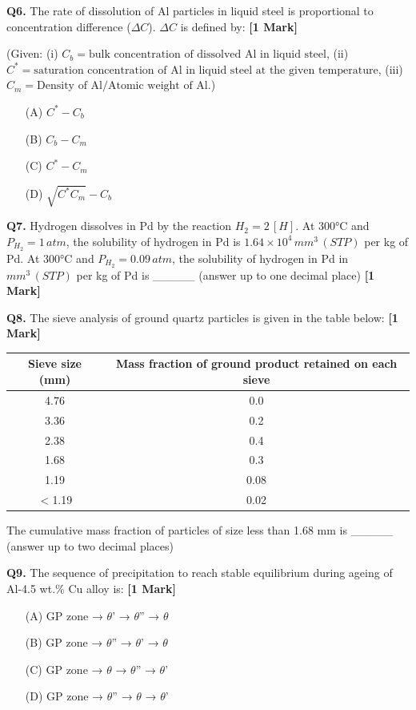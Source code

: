 \documentclass[11pt]{article}
\newcommand{\questiona}[2]{
    \noindent\textbf{Q#2.} #1 \hfill \textbf{[1 Mark]}
}
\begin{document}
\questiona{The rate of dissolution of Al particles in liquid steel is proportional to concentration difference (\(\Delta C\)). \(\Delta C\) is defined by:}{6}
(Given: (i) \( C_b = \text{bulk concentration of dissolved Al in liquid steel} \), (ii) \( C^* = \text{saturation concentration of Al in liquid steel at the given temperature} \), (iii) \( C_m = \text{Density of Al/Atomic weight of Al} \).)
\begin{enumerate}
    \item[(A)] \( C^* - C_b \)
    \item[(B)] \( C_b - C_m \)
    \item[(C)] \( C^* - C_m \)
    \item[(D)] \( \sqrt{C^* C_m} - C_b \)
\end{enumerate}
\vspace{0.5cm}

\questiona{Hydrogen dissolves in Pd by the reaction \( H_2 = 2 \, [H] \). At 300°C and \( P_{H_2} = 1 \, atm \), the solubility of hydrogen in Pd is \( 1.64 \times 10^4 \, mm^3 \, (STP) \) per kg of Pd. At 300°C and \( P_{H_2} = 0.09 \, atm \), the solubility of hydrogen in Pd in \( mm^3 \, (STP) \) per kg of Pd is \_\_\_\_\_ (answer up to one decimal place)}{7}
\vspace{0.5cm}

\questiona{The sieve analysis of ground quartz particles is given in the table below:}{8}
\begin{center}
\begin{tabular}{|c|c|}
\hline
Sieve size (mm) & Mass fraction of ground product retained on each sieve \\
\hline
4.76 & 0.0 \\
3.36 & 0.2 \\
2.38 & 0.4 \\
1.68 & 0.3 \\
1.19 & 0.08 \\
$< $1.19 & 0.02 \\
\hline
\end{tabular}
\end{center}
The cumulative mass fraction of particles of size less than 1.68 mm is \_\_\_\_\_ (answer up to two decimal places)
\vspace{0.5cm}

\questiona{The sequence of precipitation to reach stable equilibrium during ageing of Al-4.5 wt.\% Cu alloy is:}{9}
\begin{enumerate}
    \item[(A)] GP zone → $\theta$' → $\theta$'' → $\theta$
    \item[(B)] GP zone → $\theta$'' → $\theta$' → $\theta$
    \item[(C)] GP zone → $\theta$ → $\theta$'' → $\theta$'
    \item[(D)] GP zone → $\theta$'' → $\theta$ → $\theta$'
\end{enumerate}
\vspace{0.5cm}
\end{document}
